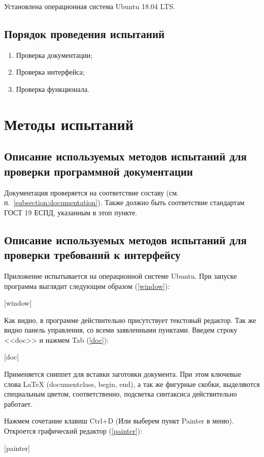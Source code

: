 \documentclass[testmethods]{espd}
\begin{document}
Установлена операционная система Ubuntu 18.04 LTS.

\subsection{Порядок проведения испытаний}
\begin{enumerate}
\item Проверка документации;
\item Проверка интерфейса;
\item Проверка функционала.
\end{enumerate}

\section{Методы испытаний}
\subsection{Описание используемых методов испытаний для проверки программной документации}
Документация проверяется на соответствие составу (см. п.~\ref{subsection:documentation}). Также должно быть соответствие стандартам ГОСТ 19 ЕСПД, указанным в этоп пункте.

\subsection{Описание используемых методов испытаний для проверки требований к интерфейсу}
Приложение испытывается на операционной системе Ubuntu. При запуске программа выглядит следующим образом (\ref{window}):

[window]

Как видно, в программе действительно присутствует текстовый редактор. Так же видно панель управления, со всеми заявленными пунктами. Введем строку <<doc>> и нажмем Tab (\ref{doc}):

[doc]

Применяется сниппет для вставки заготовки документа. При этом ключевые слова LaTeX (documentclass, begin, end), а так же фигурные скобки, выделяются специальным цветом, соответственно, подсветка синтаксиса действительно работает.

Нажмем сочетание клавиш Ctrl+D (Или выберем пункт Painter в меню). Откроется графический редактор (\ref{painter}):

[painter]
\end{document}
